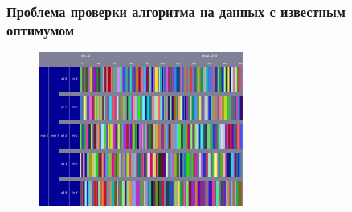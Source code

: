 \begin{frame}
    \frametitle{Проблема проверки алгоритма на данных с известным оптимумом}
    \begin{figure}
        \includegraphics[width=0.6\textwidth]{imgs/balanced-schedule.jpg}
    \end{figure}
\end{frame}

